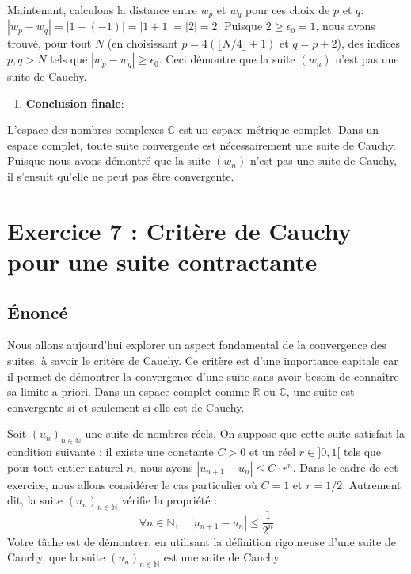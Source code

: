 \documentclass[a4paper,11pt]{report}
\begin{document}
    Maintenant, calculons la distance entre $w_p$ et $w_q$ pour ces choix de $p$ et $q$:
    $|w_p - w_q| = |1 - (-1)| = |1+1| = |2| = 2$.
    Puisque $2 \ge \epsilon_0 = 1$, nous avons trouvé, pour tout $N$ (en choisissant $p=4(\lfloor N/4 \rfloor + 1)$ et $q=p+2$), des indices $p, q > N$ tels que $|w_p - w_q| \ge \epsilon_0$.
    Ceci démontre que la suite $(w_n)$ n'est pas une suite de Cauchy.
\begin{enumerate}
\item \textbf{Conclusion finale}:
\end{enumerate}
    L'espace des nombres complexes $\mathbb{C}$ est un espace métrique complet. Dans un espace complet, toute suite convergente est nécessairement une suite de Cauchy. Puisque nous avons démontré que la suite $(w_n)$ n'est pas une suite de Cauchy, il s'ensuit qu'elle ne peut pas être convergente.

\vspace{1cm}

\section*{Exercice 7 : Critère de Cauchy pour une suite contractante}
\subsection*{Énoncé}

Nous allons aujourd'hui explorer un aspect fondamental de la convergence des suites, à savoir le critère de Cauchy. Ce critère est d'une importance capitale car il permet de démontrer la convergence d'une suite sans avoir besoin de connaître sa limite a priori. Dans un espace complet comme $\mathbb{R}$ ou $\mathbb{C}$, une suite est convergente si et seulement si elle est de Cauchy.

Soit $(u_n)_{n \in \mathbb{N}}$ une suite de nombres réels. On suppose que cette suite satisfait la condition suivante : il existe une constante $C > 0$ et un réel $r \in ]0, 1[$ tels que pour tout entier naturel $n$, nous ayons $|u_{n+1} - u_n| \le C \cdot r^n$.
Dans le cadre de cet exercice, nous allons considérer le cas particulier où $C=1$ et $r=1/2$. Autrement dit, la suite $(u_n)_{n \in \mathbb{N}}$ vérifie la propriété :
$$ \forall n \in \mathbb{N}, \quad |u_{n+1} - u_n| \le \frac{1}{2^n} $$
Votre tâche est de démontrer, en utilisant la définition rigoureuse d'une suite de Cauchy, que la suite $(u_n)_{n \in \mathbb{N}}$ est une suite de Cauchy.
\end{document}
